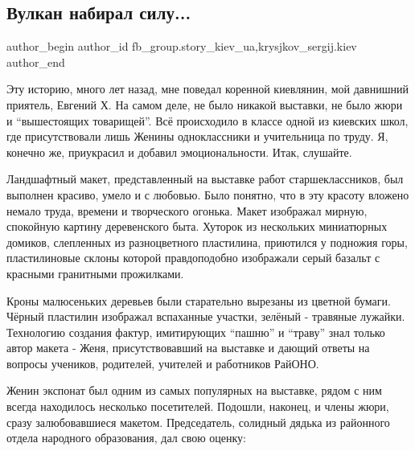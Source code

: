  
 
 
 
 
 
\subsection{Вулкан набирал силу...}
\label{sec:31_12_2021.fb.fb_group.story_kiev_ua.2.vulkan}
 
\ifcmt
 author_begin
   author_id fb_group.story_kiev_ua,krysjkov_sergij.kiev
 author_end
\fi

Эту историю, много лет назад, мне поведал коренной киевлянин, мой давнишний
приятель, Евгений Х. На самом деле, не было никакой выставки, не было жюри и
\enquote{вышестоящих товарищей}. Всё происходило в классе одной из киевских
школ, где присутствовали лишь Женины одноклассники и учительница по труду. Я,
конечно же, приукрасил и добавил эмоциональности. Итак, слушайте.


Ландшафтный макет, представленный на выставке работ старшеклассников, был
выполнен красиво, умело и с любовью. Было понятно, что в эту красоту вложено
немало труда, времени и творческого огонька. Макет изображал мирную, спокойную
картину деревенского быта. Хуторок из нескольких миниатюрных домиков,
слепленных из разноцветного пластилина, приютился у подножия горы,
пластилиновые склоны которой правдоподобно изображали серый базальт с красными
гранитными прожилками.

Кроны малюсеньких деревьев были старательно вырезаны из цветной бумаги. Чёрный
пластилин изображал вспаханные участки, зелёный - травяные лужайки. Технологию
создания фактур, имитирующих \enquote{пашню} и \enquote{траву} знал только
автор макета - Женя, присутствовавший на выставке и дающий ответы на вопросы
учеников, родителей, учителей и работников РайОНО.

Женин экспонат был одним из самых популярных на выставке, рядом с ним всегда
находилось несколько посетителей. Подошли, наконец, и члены жюри, сразу
залюбовавшиеся макетом. Председатель, солидный дядька из районного отдела
народного образования, дал свою оценку:

